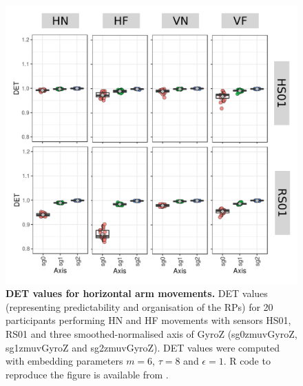 \begin{figure}
\centering
\includegraphics[width=1.0\textwidth]{det-bp}
    \caption{
	{\bf DET values for horizontal arm movements.}	
    	DET values (representing predictability and organisation of the RPs)
	for 20 participants performing HN and HF movements
	with sensors HS01, RS01 and three smoothed-normalised axis 
	of GyroZ (sg0zmuvGyroZ, sg1zmuvGyroZ and sg2zmuvGyroZ).
	DET values were computed with 
	embedding parameters $m=6$, $\tau=8$ and $\epsilon=1$.
	R code to reproduce the figure is available from \cite{hwum2018}.
        }
    \label{fig:det_aH}
\end{figure}


\newpage
